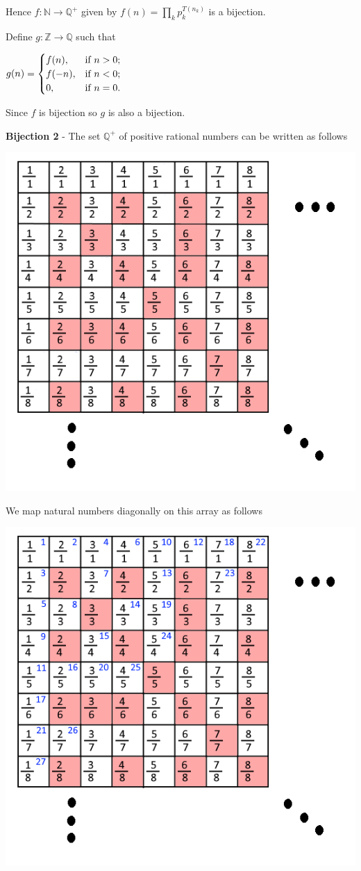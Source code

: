 \documentclass{article}
\begin{document}
    \qquad Hence $f: \mathbb{N}\rightarrow \mathbb{Q^+}$ given by $f(n)=\prod_{k}p_k^{T(n_k)}$ is a bijection.
    
    
    \qquad Define $g: \mathbb{Z} \rightarrow \mathbb{Q}$ such that
    
    \qquad $g(n)=
    \begin{cases}
        f(n), & \hbox{if $n>0$;} \\
        f(-n), & \hbox{if $n<0$;} \\
        0, & \hbox{if $n=0$.}
    \end{cases}$
    
    \qquad Since $f$ is bijection so $g$ is also a bijection. 
                
    \quad \textbf{Bijection 2} - The set $\mathbb{Q^+}$ of positive rational numbers can be written as follows

    \begin{center}
    \includegraphics[width=3.5 in]{Images/q4-1.png}
    \end{center}
    
    \quad We map natural numbers diagonally on this array as follows
    
    \begin{center}
    \includegraphics[width=3.5 in]{Images/q4-2.png}
    \end{center}
    
\end{document}
